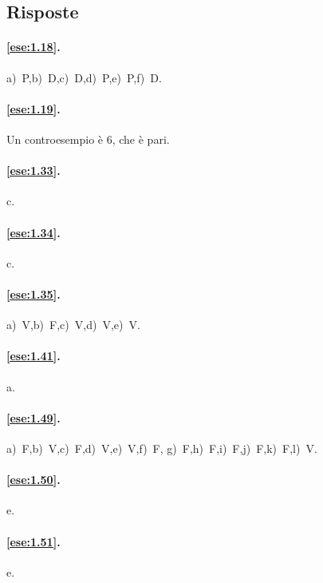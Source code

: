 \subsection{Risposte}

\begingroup
\hypersetup{linkcolor=black}

\paragraph{\ref{ese:1.18}.}
a)~P,\quad b)~D,\quad c)~D,\quad d)~P,\quad e)~P,\quad f)~D.

\paragraph{\ref{ese:1.19}.}
Un controesempio è 6, che è pari.


\paragraph{\ref{ese:1.33}.}
c.

\paragraph{\ref{ese:1.34}.}
c.

\paragraph{\ref{ese:1.35}.}
a)~V,\quad b)~F,\quad c)~V,\quad d)~V,\quad e)~V.

\paragraph{\ref{ese:1.41}.}
a.

\paragraph{\ref{ese:1.49}.}
a)~F,\quad b)~V,\quad c)~F,\quad d)~V,\quad e)~V,\quad f)~F,\quad 
g)~F,\quad h)~F,\quad i)~F,\quad j)~F,\quad k)~F,\quad l)~V.

\paragraph{\ref{ese:1.50}.}
e.

\paragraph{\ref{ese:1.51}.}
e.

